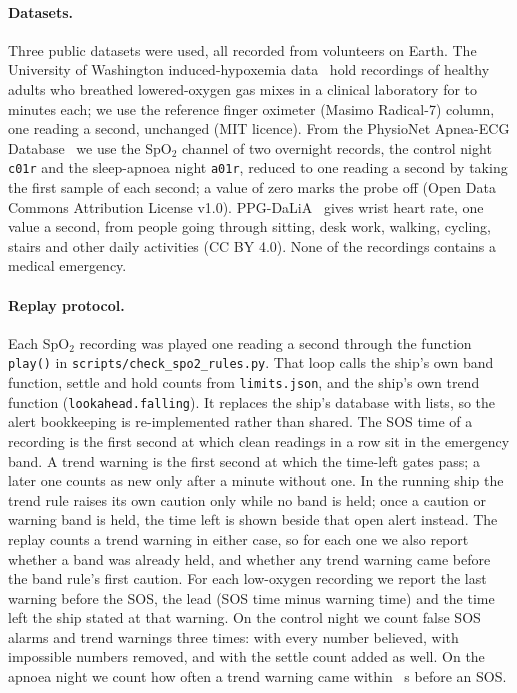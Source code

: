 \paragraph{Datasets.}
Three public datasets were used, all recorded from volunteers on Earth. The University of Washington induced-hypoxemia data~\cite{hoffman2022oximetry} hold \numUwEvents{} recordings of healthy adults who breathed lowered-oxygen gas mixes in a clinical laboratory for \numUwMinutesMin{} to \numUwMinutesMax{} minutes each; we use the reference finger oximeter (Masimo Radical-7) column, one reading a second, unchanged (MIT licence). From the PhysioNet Apnea-ECG Database~\cite{penzel2000apnea,physionetApnea,goldberger2000physionet} we use the SpO$_2$ channel of two overnight records, the control night \texttt{c01r} and the sleep-apnoea night \texttt{a01r}, reduced to one reading a second by taking the first sample of each second; a value of zero marks the probe off (Open Data Commons Attribution License v1.0). PPG-DaLiA~\cite{reiss2019ppg,ppgDaliaData} gives wrist heart rate, one value a second, from \numHrPeople{} people going through sitting, desk work, walking, cycling, stairs and other daily activities (CC BY 4.0). None of the recordings contains a medical emergency.

\paragraph{Replay protocol.}
Each SpO$_2$ recording was played one reading a second through the function \texttt{play()} in \nolinkurl{scripts/check_spo2_rules.py}. That loop calls the ship's own band function, settle and hold counts from \texttt{limits.json}, and the ship's own trend function (\texttt{lookahead.falling}). It replaces the ship's database with lists, so the alert bookkeeping is re-implemented rather than shared. The SOS time of a recording is the first second at which \numSustainN{} clean readings in a row sit in the emergency band. A trend warning is the first second at which the time-left gates pass; a later one counts as new only after a minute without one. In the running ship the trend rule raises its own caution only while no band is held; once a caution or warning band is held, the time left is shown beside that open alert instead. The replay counts a trend warning in either case, so for each one we also report whether a band was already held, and whether any trend warning came before the band rule's first caution. For each low-oxygen recording we report the last warning before the SOS, the lead (SOS time minus warning time) and the time left the ship stated at that warning. On the control night we count false SOS alarms and trend warnings three times: with every number believed, with impossible numbers removed, and with the settle count added as well. On the apnoea night we count how often a trend warning came within \numApneaLookbackS~s before an SOS.

